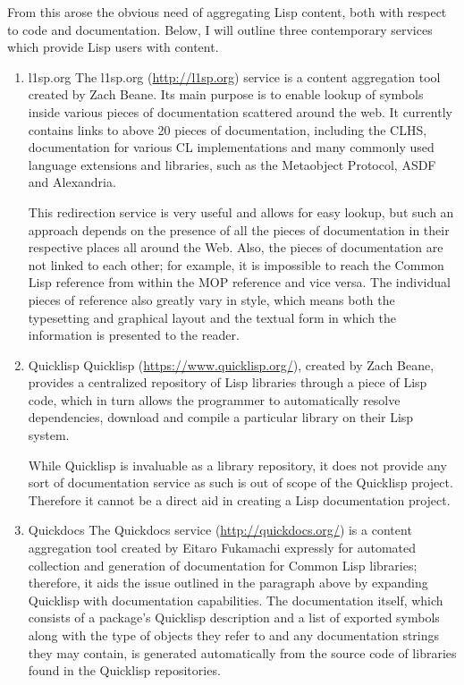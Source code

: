 \documentclass[11pt]{article}
\begin{document}
From this arose the obvious need of aggregating Lisp content, both with respect to code and documentation. Below, I will outline three contemporary services which provide Lisp users with content.
\begin{enumerate}
\item l1sp.org
\label{sec:orgfc9f558}
The l1sp.org (\url{http://l1sp.org}) service is a content aggregation tool created by Zach Beane. Its main purpose is to enable lookup of symbols inside various pieces of documentation scattered around the web. It currently contains links to above 20 pieces of documentation, including the CLHS, documentation for various CL implementations and many commonly used language extensions and libraries, such as the Metaobject Protocol, ASDF and Alexandria.

This redirection service is very useful and allows for easy lookup, but such an approach depends on the presence of all the pieces of documentation in their respective places all around the Web. Also, the pieces of documentation are not linked to each other; for example, it is impossible to reach the Common Lisp reference from within the MOP reference and vice versa. The individual pieces of reference also greatly vary in style, which means both the typesetting and graphical layout and the textual form in which the information is presented to the reader.
\item Quicklisp
\label{sec:org285a30e}
Quicklisp (\url{https://www.quicklisp.org/}), created by Zach Beane, provides a centralized repository of Lisp libraries through a piece of Lisp code, which in turn allows the programmer to automatically resolve dependencies, download and compile a particular library on their Lisp system.

While Quicklisp is invaluable as a library repository, it does not provide any sort of documentation service as such is out of scope of the Quicklisp project. Therefore it cannot be a direct aid in creating a Lisp documentation project.
\item Quickdocs
\label{sec:org91c639f}
The Quickdocs service (\url{http://quickdocs.org/}) is a content aggregation tool created by Eitaro Fukamachi expressly for automated collection and generation of documentation for Common Lisp libraries; therefore, it aids the issue outlined in the paragraph above by expanding Quicklisp with documentation capabilities. The documentation itself, which consists of a package's Quicklisp description and a list of exported symbols along with the type of objects they refer to and any documentation strings they may contain, is generated automatically from the source code of libraries found in the Quicklisp repositories.


\end{enumerate}
\end{document}

